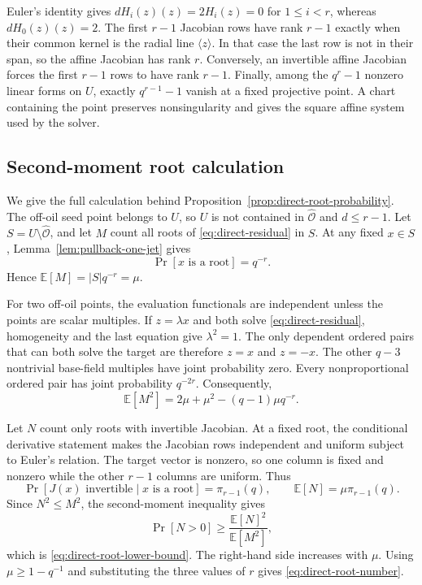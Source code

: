 \documentclass[11pt,a4paper]{article}
\theoremstyle{definition}
\theoremstyle{remark}
\newcommand{\cO}{\mathcal O}
\begin{document}
Euler's identity gives $dH_i(z)(z)=2H_i(z)=0$ for $1\le i<r$, whereas
$dH_0(z)(z)=2$.  The first $r-1$ Jacobian rows have rank $r-1$ exactly when
their common kernel is the radial line $\langle z\rangle$.  In that case the
last row is not in their span, so the affine Jacobian has rank $r$.
Conversely, an invertible affine Jacobian forces the first $r-1$ rows to have
rank $r-1$.  Finally, among the $q^r-1$ nonzero linear forms on $U$, exactly
$q^{r-1}-1$ vanish at a fixed projective point.  A chart containing the point
preserves nonsingularity and gives the square affine system used by the
solver.

\subsection{Second-moment root calculation}

We give the full calculation behind
Proposition~\ref{prop:direct-root-probability}.  The off-oil seed point belongs
to $U$, so $U$ is not contained in $\widehat{\cO}$ and $d\le r-1$.  Let
$S=U\setminus\widehat{\cO}$, and let $M$ count all roots of
\eqref{eq:direct-residual} in $S$.  At any fixed $x\in S$,
Lemma~\ref{lem:pullback-one-jet} gives
\[
 \Pr[x\text{ is a root}]=q^{-r}.
\]
Hence $\mathbb E[M]=|S|q^{-r}=\mu$.

For two off-oil points, the evaluation functionals are independent unless the
points are scalar multiples.  If $z=\lambda x$ and both solve
\eqref{eq:direct-residual}, homogeneity and the last equation give
$\lambda^2=1$.  The only dependent ordered pairs that can both solve the
target are therefore $z=x$ and $z=-x$.  The other $q-3$ nontrivial base-field
multiples have joint probability zero.  Every nonproportional ordered pair has
joint probability $q^{-2r}$.  Consequently,
\[
 \mathbb E[M^2]
 =2\mu+\mu^2-(q-1)\mu q^{-r}.
\]

Let $N$ count only roots with invertible Jacobian.  At a fixed root, the
conditional derivative statement makes the Jacobian rows independent and
uniform subject to Euler's relation.  The target vector is nonzero, so one
column is fixed and nonzero while the other $r-1$ columns are uniform.  Thus
\[
 \Pr[J(x)\text{ invertible}\mid x\text{ is a root}]
 =\pi_{r-1}(q),
 \qquad
 \mathbb E[N]=\mu\pi_{r-1}(q).
\]
Since $N^2\le M^2$, the second-moment inequality gives
\[
 \Pr[N>0]
 \ge\frac{\mathbb E[N]^2}{\mathbb E[M^2]},
\]
which is \eqref{eq:direct-root-lower-bound}.  The right-hand side increases
with $\mu$.  Using $\mu\ge1-q^{-1}$ and substituting the three values of $r$
gives \eqref{eq:direct-root-number}.
\end{document}
